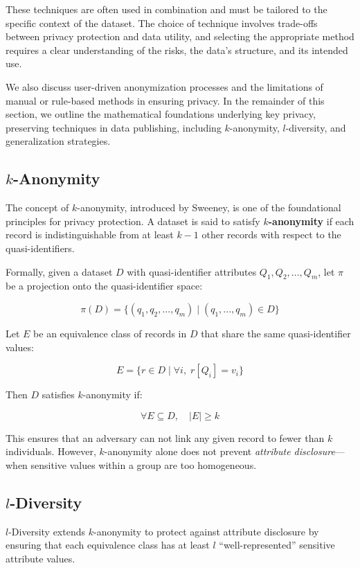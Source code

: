 \documentclass{article}
\begin{document}
These techniques are often used in combination and must be tailored to the specific context of the dataset. The choice of technique involves trade-offs between privacy protection and data utility, and selecting the appropriate method requires a clear understanding of the risks, the data's structure, and its intended use.


We also discuss user-driven anonymization processes and the limitations of manual or rule-based methods in ensuring privacy. In the remainder of this section, we outline the mathematical foundations underlying key privacy, preserving techniques in data publishing, including $k$-anonymity, $l$-diversity, and generalization strategies.

\subsection{$k$-Anonymity}

The concept of $k$-anonymity, introduced by Sweeney, is one of the foundational principles for privacy protection. A dataset is said to satisfy \textbf{$k$-anonymity} if each record is indistinguishable from at least $k-1$ other records with respect to the quasi-identifiers.

Formally, given a dataset $D$ with quasi-identifier attributes $Q_1, Q_2, ..., Q_m$, let $\pi$ be a projection onto the quasi-identifier space:

$$
\pi(D) = \{ (q_1, q_2, ..., q_m) \mid (q_1, ..., q_m) \in D \}
$$

Let $E$ be an equivalence class of records in $D$ that share the same quasi-identifier values:

$$
E = \{ r \in D \mid \forall i, \; r[Q_i] = v_i \}
$$

Then $D$ satisfies $k$-anonymity if:

$$
\forall E \subseteq D, \quad |E| \geq k
$$

This ensures that an adversary can not link any given record to fewer than $k$ individuals. However, $k$-anonymity alone does not prevent \textit{attribute disclosure}—when sensitive values within a group are too homogeneous.

\subsection{$l$-Diversity }

$l$-Diversity extends $k$-anonymity to protect against attribute disclosure by ensuring that each equivalence class has at least $l$ ``well-represented'' sensitive attribute values.
\end{document}
